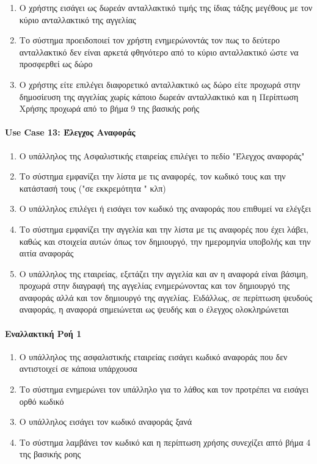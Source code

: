 \documentclass{../ol-softwaremanual}
\begin{document}
	\begin{enumerate}
		\item Ο χρήστης εισάγει ως δωρεάν ανταλλακτικό τιμής της ίδιας τάξης μεγέθους με τον κύριο ανταλλακτικό της αγγελίας
		\item Το σύστημα προειδοποιεί τον χρήστη ενημερώνοντάς τον πως το δεύτερο ανταλλακτικό δεν είναι αρκετά φθηνότερο από το κύριο ανταλλακτικό ώστε να προσφερθεί ως δώρο
		\item Ο χρήστης είτε επιλέγει διαφορετικό ανταλλακτικό ως δώρο είτε προχωρά στην δημοσίευση της αγγελίας χωρίς κάποιο δωρεάν ανταλλακτικό και η Περίπτωση Χρήσης προχωρά από το βήμα 9 της βασικής ροής
	\end{enumerate}


\paragraph{\en Use Case 13: \gr Έλεγχος Αναφοράς}  
\begin{enumerate}
\item Ο υπάλληλος της Ασφαλιστικής εταιρείας επιλέγει το πεδίο \en"\gr Έλεγχος αναφοράς\en"\gr
\item Το σύστημα εμφανίζει την λίστα με τις αναφορές, τον κωδικό τους και την κατάστασή τους (\en"\gr σε εκκρεμότητα \en" \gr κλπ)
\item Ο υπάλληλος επιλέγει ή εισάγει τον κωδικό της αναφοράς που επιθυμεί να ελέγξει 
\item Το σύστημα εμφανίζει την αγγελία και την λίστα με τις αναφορές που έχει λάβει, καθώς και στοιχεία αυτών όπως τον δημιουργό, την ημερομηνία υποβολής και την αιτία αναφοράς 
\item Ο υπάλληλος της εταιρείας, εξετάζει την αγγελία και αν η αναφορά είναι βάσιμη, προχωρά στην διαγραφή της αγγελίας ενημερώνοντας και τον δημιουργό της αναφοράς αλλά και τον δημιουργό της αγγελίας. Ειδάλλως, σε περίπτωση ψευδούς αναφοράς, η αναφορά σημειώνεται ως ψευδής και ο έλεγχος ολοκληρώνεται
\end{enumerate}

\paragraph{Εναλλακτική Ροή 1}
\begin{enumerate}
\item Ο υπάλληλος της ασφαλιστικής εταιρείας εισάγει κωδικό αναφοράς που δεν αντιστοιχεί σε κάποια υπάρχουσα
\item Το σύστημα ενημερώνει τον υπάλληλο  για το λάθος και τον προτρέπει  να εισάγει ορθό κωδικό 
\item Ο υπάλληλος εισάγει τον κωδικό αναφοράς ξανά
\item Το σύστημα λαμβάνει τον κωδικό και η περίπτωση χρήσης συνεχίζει απτό βήμα 4 της βασικής ροης
\end{enumerate}
\end{document}
